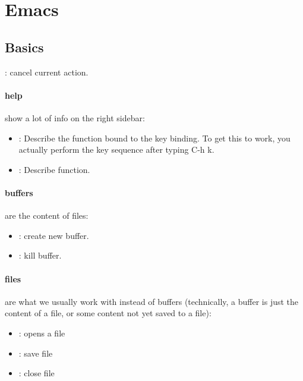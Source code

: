 \section{Emacs}

\subsection{Basics}

: cancel current action.


\paragraph{help} show a lot of info on the right sidebar: 
\begin{itemize}
\item {}: Describe the function bound to the key binding. To get this to work, you actually perform the key sequence after typing C-h k.
\item {}: Describe function. 
\end{itemize}

\paragraph{buffers} are the content of files:
\begin{itemize}
    \item {}: create new buffer.
    \item {}: kill buffer.
\end{itemize}


\paragraph{files} are what we usually work with instead of buffers (technically, a buffer is just the content of a file, or some content not yet saved to a file):
\begin{itemize}
    \item {}: opens a file
    \item {}: save file
    \item {}: close file
\end{itemize}


